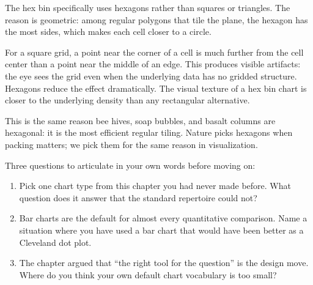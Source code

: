 \documentclass[
  letterpaper,
  11pt,
  twoside,
  openany]{scrbook}
\begin{document}
\begin{tcolorbox}[enhanced jigsaw, arc=.35mm, bottomrule=.15mm, bottomtitle=1mm, breakable, colback=white, colbacktitle=quarto-callout-note-color!10!white, colframe=quarto-callout-note-color-frame, coltitle=black, left=2mm, leftrule=.75mm, opacityback=0, opacitybacktitle=0.6, rightrule=.15mm, title=\textcolor{quarto-callout-note-color}{\faInfo}\hspace{0.5em}{Inside the math: why hexagons}, titlerule=0mm, toprule=.15mm, toptitle=1mm]

The hex bin specifically uses hexagons rather than squares or triangles.
The reason is geometric: among regular polygons that tile the plane, the
hexagon has the most sides, which makes each cell closer to a circle.

For a square grid, a point near the corner of a cell is much further
from the cell center than a point near the middle of an edge. This
produces visible artifacts: the eye sees the grid even when the
underlying data has no gridded structure. Hexagons reduce the effect
dramatically. The visual texture of a hex bin chart is closer to the
underlying density than any rectangular alternative.

This is the same reason bee hives, soap bubbles, and basalt columns are
hexagonal: it is the most efficient regular tiling. Nature picks
hexagons when packing matters; we pick them for the same reason in
visualization.

\end{tcolorbox}

\begin{tcolorbox}[enhanced jigsaw, arc=.35mm, bottomrule=.15mm, bottomtitle=1mm, breakable, colback=white, colbacktitle=quarto-callout-caution-color!10!white, colframe=quarto-callout-caution-color-frame, coltitle=black, left=2mm, leftrule=.75mm, opacityback=0, opacitybacktitle=0.6, rightrule=.15mm, title=\textcolor{quarto-callout-caution-color}{\faFire}\hspace{0.5em}{Reflect before moving on}, titlerule=0mm, toprule=.15mm, toptitle=1mm]

Three questions to articulate in your own words before moving on:

\begin{enumerate}
\def\labelenumi{\arabic{enumi}.}
\item
  Pick one chart type from this chapter you had never made before. What
  question does it answer that the standard repertoire could not?
\item
  Bar charts are the default for almost every quantitative comparison.
  Name a situation where you have used a bar chart that would have been
  better as a Cleveland dot plot.
\item
  The chapter argued that ``the right tool for the question'' is the
  design move. Where do you think your own default chart vocabulary is
  too small?
\end{enumerate}

\end{tcolorbox}
\end{document}
